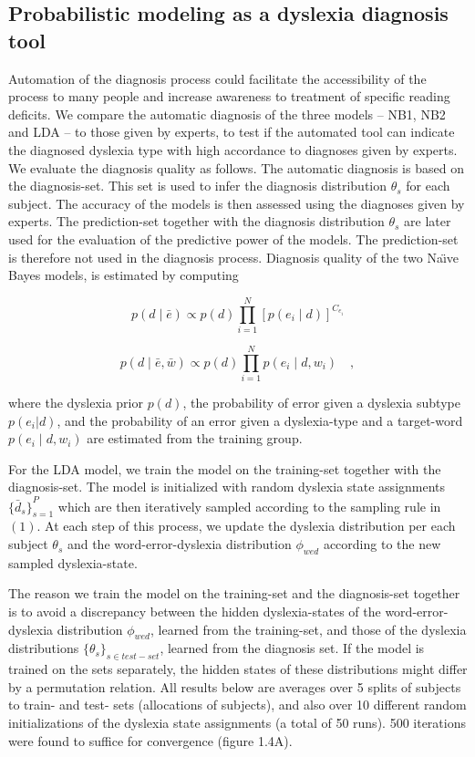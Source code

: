 {{\subsection{Probabilistic modeling as a dyslexia diagnosis tool}
Automation of the diagnosis process could facilitate the accessibility of the process to many people and increase awareness to treatment of specific reading deficits. We compare the automatic diagnosis of the three models -- NB1, NB2 and LDA -- to those given by experts, to test if the automated tool can indicate the diagnosed dyslexia type with high accordance to diagnoses given by experts.
We evaluate the diagnosis quality as follows. The automatic diagnosis is based on the diagnosis-set. This set is used to infer the diagnosis distribution $ \theta_{s} $ for each subject. The accuracy of the models is then assessed using the diagnoses given by experts. The prediction-set together with the diagnosis distribution $ \theta_{s} $ are later used for the evaluation of the predictive power of the models. The prediction-set is therefore not used in the diagnosis process.
Diagnosis quality of the two Na\"{\i}ve Bayes models, is estimated by computing 

\begin{equation}
p(d \mid \bar{e}) \propto p(d) \prod_{i = 1}^N [p(e_i \mid d)]^{C_{e_i}}
\end{equation}

\begin{equation}
p(d \mid \bar{e}, \bar{w}) \propto p(d) \prod_{i = 1}^N p(e_i \mid d, w_i) \quad ,
\end{equation}

where the dyslexia prior $ p(d) $, the probability of error given a dyslexia subtype $ p(e_i |d) $, and the probability of an error given a dyslexia-type and a target-word $ p(e_i \mid d,w_i ) $ are estimated from the training group.

For the LDA model, we train the model on the training-set together with the diagnosis-set. The model is initialized with random dyslexia state assignments $ { \{ \bar{d}_{s} \} }_{s=1}^P $ which are then iteratively sampled according to the sampling rule in $(1)$. At each step of this process, we update the dyslexia distribution per each subject $ \theta_{s} $ and the word-error-dyslexia distribution $ \phi_{wed} $ according to the new sampled dyslexia-state.

The reason we train the model on the training-set and the diagnosis-set together is to avoid a discrepancy between the hidden dyslexia-states of the word-error-dyslexia distribution $ \phi_{wed} $, learned from the training-set, and those of the dyslexia distributions $ { \{ \theta_{s} \} }_{s \in test-set} $, learned from the diagnosis set. If the model is trained on the sets separately, the hidden states of these distributions might differ by a permutation relation. All results below are averages over 5 splits of subjects to train- and test- sets (allocations of subjects), and also over 10 different random initializations of the dyslexia state assignments (a total of 50 runs). 500 iterations were found to suffice for convergence (figure 1.4A).

}}
